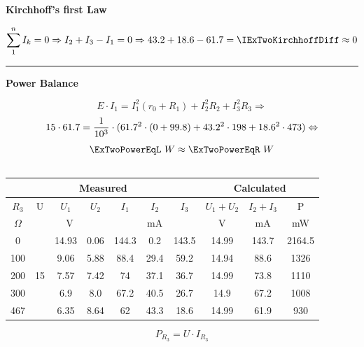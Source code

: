 \documentclass{article}
\begin{document}
			\begin{minipage}{\textwidth}
				\begin{center} \textbf{Kirchhoff's first Law} \end{center}
				\[
					\sum_{1}^{n} I_k = 0 \Rightarrow I_2 + I_3 - I_1 = 0 \Rightarrow \IExTwoTwo + \IExTwoThree - \IExTwoOne = \IExTwoKirchhoffDiff \approx 0
				\]
				\hrule
				\begin{center} \textbf{Power Balance} \end{center}



				\[
					E \cdot I_1 = I_1 ^ 2 (r_0 + R_1) + I_2 ^ 2 R_2 + I_3 ^ 2 R_3 \Rightarrow
				\]
				\[
					15 \cdot 61.7 = \frac{1}{10 ^ 3} \cdot (61.7 ^ 2 \cdot (0 + 99.8) + 43.2 ^ 2 \cdot 198 + 18.6 ^ 2 \cdot 473)  \Leftrightarrow
				\]
				\[
					\ExTwoPowerEqL \ W \approx \ExTwoPowerEqR \ W
				\]
			\end{minipage}


		\subsection{}
			\begin{center} \begin{tabular}{|c|c|c|c|c|c|c|c|c|c|}
				\hline
				\multicolumn{7}{|c}{\textbf{Measured}} & \multicolumn{3}{|c|}{\textbf{Calculated}}\\
				\hline
				$R_3$ & U & $U_1$ & $U_2$ & $I_1$ & $I_2$ & $I_3$ & $U_1 + U_2$ & $I_2 + I_3$ & P\\
				\hline
				$\Omega$ & \multicolumn{3}{c|}{V} & \multicolumn{3}{c|}{mA} & V & mA & mW\\	
				\hline
				0 & \multirow{6}{*}{15} & 14.93 & 0.06 & 144.3 & 0.2 & 143.5 & 14.99 & 143.7 & 2164.5\\
				100 & & 9.06 & 5.88 & 88.4 & 29.4 & 59.2 & 14.94 & 88.6 & 1326\\
				200 & & 7.57 & 7.42 & 74 & 37.1 & 36.7 & 14.99 & 73.8 & 1110\\
				300 & & 6.9 & 8.0 & 67.2 & 40.5 & 26.7 & 14.9 & 67.2 & 1008\\
				467 & & 6.35 & 8.64 & 62 & 43.3 & 18.6 & 14.99 & 61.9 & 930\\
				\hline
			\end{tabular} \end{center}
			\[
				P_{R_3} = U \cdot I_{R_3} 
			\]
\end{document}
